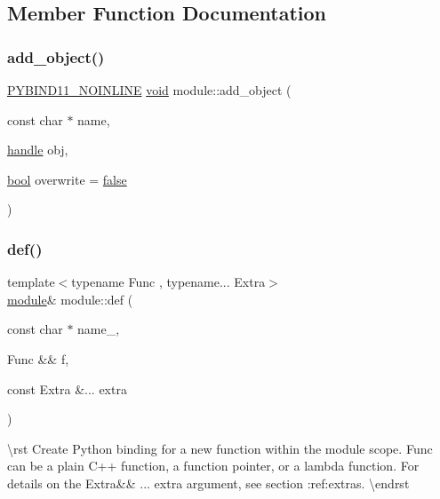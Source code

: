 \subsection{Member Function Documentation}
\mbox{\label{classmodule_a96d24a509c6c0fc2beb7afa62dc9eb18}} 
\subsubsection{\texorpdfstring{add\_object()}{add\_object()}}
{\footnotesize\ttfamily \mbox{\hyperlink{detail_2common_8h_a1fb186b7494d5c576d902c0730ecbb71}{P\+Y\+B\+I\+N\+D11\+\_\+\+N\+O\+I\+N\+L\+I\+NE}} \mbox{\hyperlink{_s_d_l__opengles2__gl2ext_8h_ae5d8fa23ad07c48bb609509eae494c95}{void}} module\+::add\+\_\+object (\begin{DoxyParamCaption}\item[{const char $\ast$}]{name,  }\item[{\mbox{\hyperlink{classhandle}{handle}}}]{obj,  }\item[{\mbox{\hyperlink{asdl_8h_af6a258d8f3ee5206d682d799316314b1}{bool}}}]{overwrite = {\ttfamily \mbox{\hyperlink{asdl_8h_af6a258d8f3ee5206d682d799316314b1ae9de385ef6fe9bf3360d1038396b884c}{false}}} }\end{DoxyParamCaption})\hspace{0.3cm}{\ttfamily [inline]}}

\mbox{\label{classmodule_ab17b2e694f8a83305c1b707363a1ccdf}} 
\subsubsection{\texorpdfstring{def()}{def()}}
{\footnotesize\ttfamily template$<$typename Func , typename... Extra$>$ \\
\mbox{\hyperlink{classmodule}{module}}\& module\+::def (\begin{DoxyParamCaption}\item[{const char $\ast$}]{name\+\_\+,  }\item[{Func \&\&}]{f,  }\item[{const Extra \&...}]{extra }\end{DoxyParamCaption})\hspace{0.3cm}{\ttfamily [inline]}}

\textbackslash{}rst Create Python binding for a new function within the module scope. {\ttfamily Func} can be a plain C++ function, a function pointer, or a lambda function. For details on the {\ttfamily Extra\&\& ... extra} argument, see section \+:ref\+:{\ttfamily extras}. \textbackslash{}endrst \mbox{\label{classmodule_a0e559dd7ef70d0edd90d0327ddbd0c12}} 
